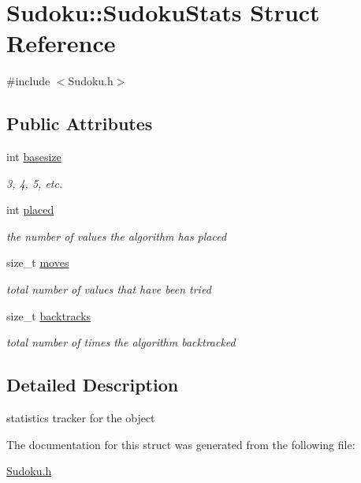 \hypertarget{structSudoku_1_1SudokuStats}{\section{Sudoku\-:\-:Sudoku\-Stats Struct Reference}
\label{structSudoku_1_1SudokuStats}
}


{\ttfamily \#include $<$Sudoku.\-h$>$}

\subsection*{Public Attributes}
\begin{DoxyCompactItemize}
\item 
\hypertarget{structSudoku_1_1SudokuStats_a3cf58dc66b8828726c8b17513c81af9f}{int \hyperlink{structSudoku_1_1SudokuStats_a3cf58dc66b8828726c8b17513c81af9f}{basesize}}\label{structSudoku_1_1SudokuStats_a3cf58dc66b8828726c8b17513c81af9f}

\begin{DoxyCompactList}\small\item\em 3, 4, 5, etc. \end{DoxyCompactList}\item 
\hypertarget{structSudoku_1_1SudokuStats_a9ffb8929860b2e70bb7389cb82e1fe75}{int \hyperlink{structSudoku_1_1SudokuStats_a9ffb8929860b2e70bb7389cb82e1fe75}{placed}}\label{structSudoku_1_1SudokuStats_a9ffb8929860b2e70bb7389cb82e1fe75}

\begin{DoxyCompactList}\small\item\em the number of values the algorithm has placed \end{DoxyCompactList}\item 
\hypertarget{structSudoku_1_1SudokuStats_a78f3038bfdc0fde05762248fa0c2eb3c}{size\-\_\-t \hyperlink{structSudoku_1_1SudokuStats_a78f3038bfdc0fde05762248fa0c2eb3c}{moves}}\label{structSudoku_1_1SudokuStats_a78f3038bfdc0fde05762248fa0c2eb3c}

\begin{DoxyCompactList}\small\item\em total number of values that have been tried \end{DoxyCompactList}\item 
\hypertarget{structSudoku_1_1SudokuStats_ab4d1c849bd236299067b56cfedd54b91}{size\-\_\-t \hyperlink{structSudoku_1_1SudokuStats_ab4d1c849bd236299067b56cfedd54b91}{backtracks}}\label{structSudoku_1_1SudokuStats_ab4d1c849bd236299067b56cfedd54b91}

\begin{DoxyCompactList}\small\item\em total number of times the algorithm backtracked \end{DoxyCompactList}\end{DoxyCompactItemize}


\subsection{Detailed Description}
statistics tracker for the object 

The documentation for this struct was generated from the following file\-:\begin{DoxyCompactItemize}
\item 
\hyperlink{Sudoku_8h}{Sudoku.\-h}\end{DoxyCompactItemize}
